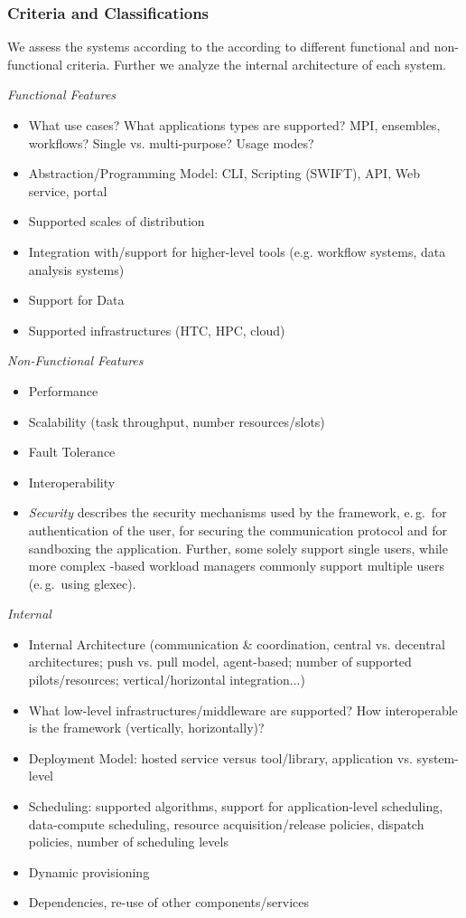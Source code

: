 \documentclass{sig-alternate}
\begin{document}
\subsubsection{Criteria and Classifications}

We assess the \pilotjob systems according to the according to different 
functional and non-functional criteria. Further we analyze the internal 
architecture of each \pilotjob system.

\noindent
\emph{Functional Features}
\begin{itemize}
	\item What use cases? What applications types are supported? MPI, 
	ensembles, workflows? Single vs. multi-purpose? Usage modes?
	\item Abstraction/Programming Model: CLI, Scripting (SWIFT), API, Web 
	service, portal
	\item Supported scales of distribution
	\item Integration with/support for higher-level tools (e.g. workflow 
	systems, data analysis systems)		
	\item Support for Data
	\item Supported infrastructures (HTC, HPC, cloud)
\end{itemize}
\emph{Non-Functional Features}
\begin{itemize}
	\item Performance 
	\item Scalability (task throughput, number resources/slots)
	\item Fault Tolerance
	\item Interoperability
	\item \emph{Security} describes the security mechanisms used by the 
	framework, e.\,g.\ for authentication of the user, for securing the 
	communication protocol and for sandboxing the application. Further, some 
	\pilotjobs solely support single users, while more complex \pilot-based 
	workload managers commonly support multiple users (e.\,g.\ using glexec).
\end{itemize}
\emph{Internal}
\begin{itemize}
	\item Internal Architecture (communication \& coordination, central 
	vs. decentral architectures; push vs. pull model, agent-based; number 
	of supported pilots/resources; vertical/horizontal integration...)
	\item What low-level infrastructures/middleware are supported? How 
	interoperable is the framework (vertically, horizontally)?
	\item Deployment Model: hosted service versus tool/library, 
	application vs. system-level
	\item Scheduling: supported algorithms, support for application-level 
	scheduling, data-compute scheduling, resource acquisition/release 
	policies, dispatch policies, number of scheduling levels	
	\item Dynamic provisioning
	\item Dependencies, re-use of other components/services	
\end{itemize}		
\end{document}
